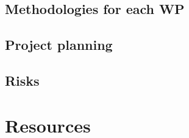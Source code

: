 \documentclass[11pt,a4paper]{article}
\begin{document}
\subsection{Methodologies for each WP}

\subsection{Project planning}





\subsection{Risks} 
\smallskip


\section{Resources}
\end{document}
